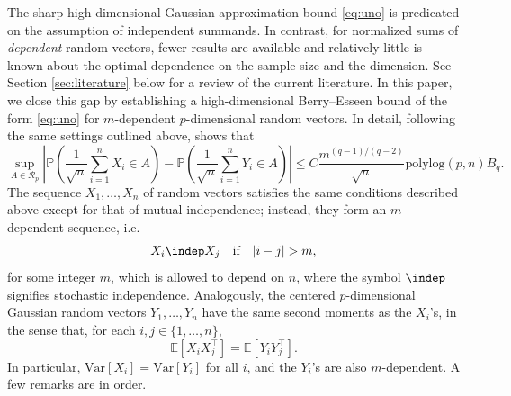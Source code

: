 \documentclass[aos]{imsart}
\begin{document}
The sharp high-dimensional Gaussian approximation bound \eqref{eq:uno} is predicated on the assumption of independent summands. In contrast, for normalized sums of {\it dependent} random vectors, fewer results are available and relatively little is known about the optimal dependence on the sample size and the dimension. See Section \ref{sec:literature} below for a review of the current literature. In this paper, we close this gap by establishing a high-dimensional Berry--Esseen bound of the form \eqref{eq:uno} for $m$-dependent $p$-dimensional random vectors. In detail, following the same settings outlined above,  shows that %
\begin{equation}\label{eq:due}
    \sup_{A \in \mathcal{R}_p} \left| \mathbb{P}\left( \frac{1}{\sqrt{n}} \sum_{i=1}^n X_i \in A \right) - \mathbb{P}\left( \frac{1}{\sqrt{n}} \sum_{i=1}^n Y_i \in A\right) \right| \leq C 
    \frac{m^{(q-1)/(q-2)} }{\sqrt{n}}
    \mathrm{polylog}(p,n) B_{q}.
\end{equation}
The sequence $X_1,\ldots,X_n$ of random vectors satisfies the same conditions described above except for that of mutual independence; instead, they form an $m$-dependent sequence, i.e. 
\begin{equation}\label{eq:m.dependence}
 X_i \indep X_j \quad \text{if} \quad |i-j|>m,
\end{equation}
for some integer $m$, which is allowed to depend on $n$, where the symbol $\indep$ signifies stochastic independence. Analogously, the centered $p$-dimensional Gaussian random vectors $Y_1,\ldots,Y_n$ have the same second moments as the $X_i$'s, in the sense that, for each $i, j \in \{1,\ldots,n\}$,
\[
\mathbb{E}[X_i X_j^\top] = \mathbb{E}[Y_i Y_j^\top].
\]
In particular, $\mathrm{Var}[X_i] = \mathrm{Var}[Y_i]$ for all $i$, and  the $Y_i$'s are also $m$-dependent. 
A few remarks are in order.
\end{document}
